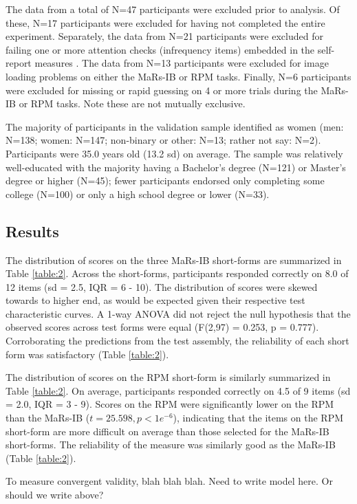 \documentclass[a4paper,man,natbib]{apa6}
\begin{document}
The data from a total of N=47 participants were excluded prior to analysis. Of these, N=17 participants were excluded for having not completed the entire experiment. Separately, the data from N=21 participants were excluded for failing one or more attention checks (infrequency items) embedded in the self-report measures \citep{zorowitz2021inattentive}. The data from N=13 participants were excluded for image loading problems on either the MaRs-IB or RPM tasks. Finally, N=6 participants were excluded for missing or rapid guessing on 4 or more trials during the MaRs-IB or RPM tasks. Note these are not mutually exclusive.

The majority of participants in the validation sample identified as women (men: N=138; women: N=147; non-binary or other: N=13; rather not say: N=2). Participants were 35.0 years old (13.2 sd) on average. The sample was relatively well-educated with the majority having a Bachelor's degree (N=121) or Master's degree or higher (N=45); fewer participants endorsed only completing some college (N=100) or only a high school degree or lower (N=33). 

\subsection{Results}

The distribution of scores on the three MaRs-IB short-forms are summarized in Table \ref{table:2}. Across the short-forms, participants responded correctly on 8.0 of 12 items (sd = 2.5, IQR = 6 - 10). The distribution of scores were skewed towards to higher end, as would be expected given their respective test characteristic curves. A 1-way ANOVA did not reject the null hypothesis that the observed scores across test forms were equal (F(2,97) = 0.253, p = 0.777). Corroborating the predictions from the test assembly, the reliability of each short form was satisfactory (Table \ref{table:2}). 

The distribution of scores on the RPM short-form is similarly summarized in Table \ref{table:2}. On average, participants responded correctly on 4.5 of 9 items (sd = 2.0, IQR = 3 - 9). Scores on the RPM were significantly lower on the RPM than the MaRs-IB ($t = 25.598, p < 1e^{-6}$), indicating that the items on the RPM short-form are more difficult on average than those selected for the MaRs-IB short-forms. The reliability of the measure was similarly good as the MaRs-IB (Table \ref{table:2}). 

To measure convergent validity, blah blah blah. Need to write model here. Or should we write above?
\end{document}
